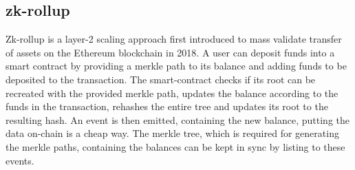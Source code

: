 \documentclass[../thesis.tex]{subfiles}
\begin{document}




\subsection{zk-rollup}
Zk-rollup \cite{vbuterin_2018} is a layer-2 scaling approach first introduced to mass validate transfer of assets on the Ethereum blockchain in 2018. A user can deposit funds into a smart contract by providing a merkle path to its balance and adding funds to be deposited to the transaction. The smart-contract checks if its root can be recreated with the provided merkle path, updates the balance according to the funds in the transaction, rehashes the entire tree and updates its root to the resulting hash. An event is then emitted, containing the new balance, putting the data on-chain is a cheap way. The merkle tree, which is required for generating the merkle paths, containing the balances can be kept in sync by listing to these events. 
\end{document}
